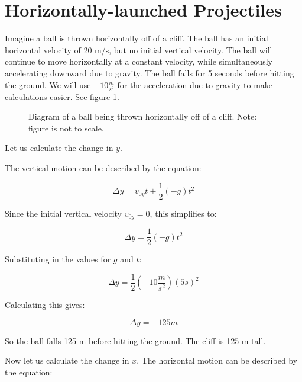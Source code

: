\section{Horizontally-launched Projectiles}
Imagine a ball is thrown horizontally off of a cliff. The ball has an initial horizontal velocity of $20$ m/s, but no initial vertical velocity. The ball will continue to move horizontally at a constant velocity, while simultaneously accelerating downward due to gravity. The ball falls for 5 seconds before hitting the ground. We will use $-10 \frac{m}{s^2}$ for the acceleration due to gravity to make calculations easier. See figure \ref{fig:horiz_launch}.
\begin{figure}[H]
    \centering
    \caption{Diagram of a ball being thrown horizontally off of a cliff. Note: figure is not to scale.}
    \label{fig:horiz_launch}
\end{figure}

Let us calculate the change in $y$. 

The vertical motion can be described by the equation:

\[
\Delta y = v_{0y} t + \frac{1}{2} (-g) t^2
\]

Since the initial vertical velocity $v_{0y} = 0$, this simplifies to:

\[
\Delta y = \frac{1}{2} (-g) t^2
\]

Substituting in the values for $g$ and $t$:

\[
\Delta y = \frac{1}{2} (-10 \frac{m}{s^2}) (5 s)^2
\]

Calculating this gives:

\[
\Delta y = -125 m
\]

So the ball falls 125 m before hitting the ground. The cliff is 125 m
tall.

Now let us calculate the change in $x$.
The horizontal motion can be described by the equation:


